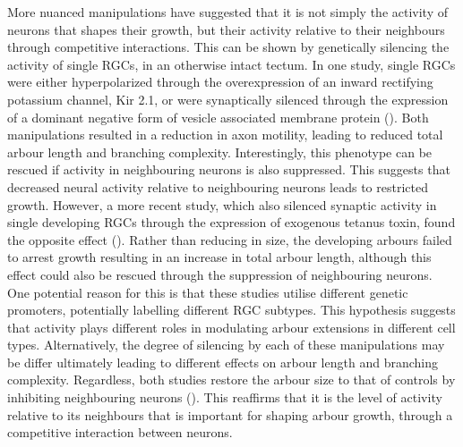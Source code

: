 More nuanced manipulations have suggested that it is not simply the activity of neurons that shapes their growth, but their activity relative to their neighbours through competitive interactions. This can be shown by genetically silencing the activity of single RGCs, in an otherwise intact tectum. In one study, single RGCs were either hyperpolarized through the overexpression of an inward rectifying potassium channel, Kir 2.1, or were synaptically silenced through the expression of a dominant negative form of vesicle associated membrane protein (\cite{Hua2005RegulationCompetition}). Both manipulations resulted in a reduction in axon motility, leading to reduced total arbour length and branching complexity. Interestingly, this phenotype can be rescued if activity in neighbouring neurons is also suppressed. This suggests that decreased neural activity relative to neighbouring neurons leads to restricted growth. However, a more recent study, which also silenced synaptic activity in single developing RGCs through the expression of exogenous tetanus toxin, found the opposite effect (\cite{Fredj2010SynapticProjection}). Rather than reducing in size, the developing arbours failed to arrest growth resulting in an increase in total arbour length, although this effect could also be rescued through the suppression of neighbouring neurons. One potential reason for this is that these studies utilise different genetic promoters, potentially labelling different RGC subtypes. This hypothesis suggests that activity plays different roles in modulating arbour extensions in different cell types. Alternatively, the degree of silencing by each of these manipulations may be differ ultimately leading to different effects on arbour length and branching complexity. Regardless, both studies restore the arbour size to that of controls by inhibiting neighbouring neurons (\cite{Kita2015TopographicZebrafish}). This reaffirms that it is the level of activity relative to its neighbours that is important for shaping arbour growth, through a competitive interaction between neurons. 


